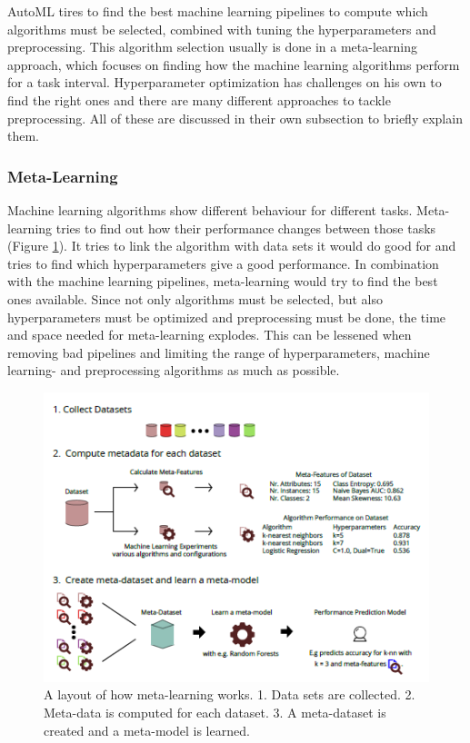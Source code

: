 \documentclass[10pt,a4paper]{article}
\begin{document}
	AutoML tires to find the best machine learning pipelines to compute which algorithms must be selected, combined with tuning the hyperparameters and preprocessing. This algorithm selection usually is done in a meta-learning approach, which focuses on finding how the machine learning algorithms perform for a task interval. Hyperparameter optimization has challenges on his own to find the right ones and there are many different approaches to tackle preprocessing. All of these are discussed in their own subsection to briefly explain them.	
	
	
	\subsubsection{Meta-Learning}
	\label{subsubsec:Meta-Learning}
	
	Machine learning algorithms show different behaviour for different tasks. Meta-learning tries to find out how their performance changes between those tasks (Figure \ref{fig:Meta-LearningLayout}). It tries to link the algorithm with data sets it would do good for and tries to find which hyperparameters give a good performance. In combination with the machine learning pipelines, meta-learning would try to find the best ones available. Since not only algorithms must be selected, but also hyperparameters must be optimized and preprocessing must be done, the time and space needed for meta-learning explodes. This can be lessened when removing bad pipelines and limiting the range of hyperparameters, machine learning- and preprocessing algorithms as much as possible. 

	\begin{figure}
		\label{fig:Meta-LearningLayout}
		\includegraphics[scale=1]{Meta-LearningLayout.png}
		\caption{A layout of how meta-learning works. 1. Data sets are collected. 2. Meta-data is computed for each dataset. 3. A meta-dataset is created and a meta-model is learned. \cite{Gijsbers2017Thesis}}
	\end{figure}
	
\end{document}
